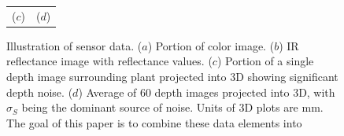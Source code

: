 \begin{figure}
\begin{center}
\begin{tabular}{ c c }
($c$) & ($d$) \\
\end{tabular}
\end{center}
\caption{Illustration of sensor data.  ($a$) Portion of color image. ($b$) IR reflectance image with reflectance values. ($c$) Portion of a single depth image surrounding plant projected into $3$D showing significant depth noise. ($d$) Average of 60 depth images projected into $3$D, with $\sigma_S$ being the dominant source of noise.  Units of $3$D plots are mm.  The goal of this paper is to combine these data elements into }
\label{fig:plantnoise}
\end{figure}
